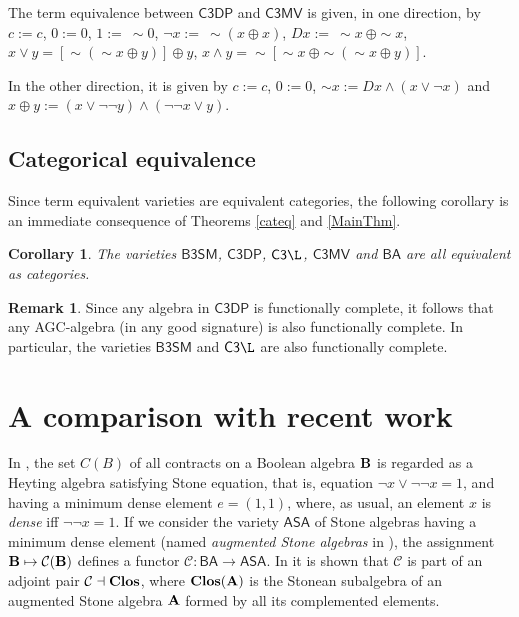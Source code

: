 \documentclass[a4paper,11pt]{article}
\newtheorem{cor}[theorem]{Corollary}
\theoremstyle{definition}
\newtheorem{rem}[theorem]{Remark}
\newcommand{\aS}{\mathsf{ASA}}
\newcommand{\clos}{\mathrm{\bf{Clos}}}
\newcommand{\hdz}{\mathsf{C3DP}}
\newcommand{\ctl}{\mathsf{C3\L}}
\newcommand{\cmv}{\mathsf{C3MV}}
\newcommand{\bool}{\mathsf{BA}}
\newcommand{\vbtsm}{\mathsf{B3SM}}
\begin{document}
The term equivalence between $\hdz$ and $\cmv$ is given, in one direction, by $c := c$, $0 := 0$, $1 := \ \sim 0$, $\neg x := \ \sim(x \oplus x)$, $Dx := \ \sim x \ \oplus \sim x$, $x \vee y = [\sim(\sim x \oplus y)] \oplus y$, $x \wedge y = \sim [ \sim x \ \oplus \sim (\sim x \oplus y)]$.  

In the other direction, it is given by $c := c$, $0 := 0$, $\sim x := Dx \wedge (x \vee \neg x)$ and $x \oplus y := (x \vee \neg \neg y) \wedge (\neg \neg x \vee y)$.


\subsection{Categorical equivalence}

Since term equivalent varieties are equivalent categories, the following corollary is an immediate consequence of Theorems \ref{cateq} and \ref{MainThm}.

\begin{cor}
The	varieties $\vbtsm$, $\hdz$, $\ctl$, $\cmv$ and $\bool$ are all equivalent as categories.
\end{cor}

\begin{rem}
Since any algebra in $\hdz$ is functionally complete, it follows that any AGC-algebra (in any good signature) is also functionally complete. 
In particular, the varieties $\vbtsm$ and $\ctl$ are also functionally complete.
\end{rem}


\section{A comparison with recent work} \label{FS}

In \cite{IRp}, the set ${C}(B)$ of all contracts on a Boolean algebra $\bf{B}$ is regarded as a Heyting algebra satisfying Stone equation, that is, equation $\neg x \vee \neg \neg x = 1$, and having a minimum dense element $e = (1,1)$, where, as usual, an element $x$ is \emph{dense} iff $\neg \neg x = 1$. 
If we consider the variety $\aS$ of Stone algebras having a minimum dense element (named \emph{augmented Stone algebras} in \cite{IRp}), 
the assignment $\bf{B} \mapsto \mathcal{C}(B)$ defines a functor $\mathcal{C} : \bool \to \aS$. 
In \cite{IRp} it is shown that $\mathcal{C}$ is part of an adjoint pair $\mathcal{C} \dashv \clos$, where  $\clos(\bf{A})$ is the Stonean subalgebra of an augmented Stone algebra $\bf{A}$ formed by all its complemented elements. 
\end{document}

